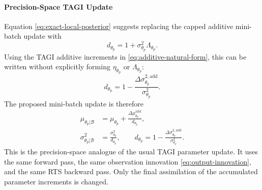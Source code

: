 \documentclass[11pt]{article}
\begin{document}
\paragraph{Precision-Space TAGI Update}
Equation \eqref{eq:exact-local-posterior} suggests replacing the capped
additive mini-batch update with
\begin{equation}
    d_{\theta_p}
    =
    1+\sigma^2_{\theta_p}\Lambda_{\theta_p}.
    \label{eq:precision-denom}
\end{equation}
Using the TAGI additive increments in \eqref{eq:additive-natural-form}, this
can be written without explicitly forming
\(
\eta_{\theta_p}
\)
or
\(
\Lambda_{\theta_p}
\):
\begin{equation}
    d_{\theta_p}
    =
    1
    -
    \frac{
    \Delta \sigma_{\theta_p}^{2,\mathrm{add}}
    }{
    \sigma^2_{\theta_p}
    }.
    \label{eq:denom-from-delta}
\end{equation}
The proposed mini-batch update is therefore
\begin{equation}
\boxed{
\begin{aligned}
    \mu_{\theta_p|\mathcal{B}}
    &=
    \mu_{\theta_p}
    +
    \frac{
    \Delta \mu_{\theta_p}^{\mathrm{add}}
    }{
    d_{\theta_p}
    },
    \\
    \sigma^2_{\theta_p|\mathcal{B}}
    &=
    \frac{
    \sigma^2_{\theta_p}
    }{
    d_{\theta_p}
    },
    \qquad
    d_{\theta_p}
    =
    1
    -
    \frac{
    \Delta \sigma_{\theta_p}^{2,\mathrm{add}}
    }{
    \sigma^2_{\theta_p}
    }.
\end{aligned}}
\label{eq:precision-tagi-update}
\end{equation}
This is the precision-space analogue of the usual TAGI parameter update. It
uses the same forward pass, the same observation innovation
\eqref{eq:output-innovation}, and the same RTS backward pass. Only the final
assimilation of the accumulated parameter increments is changed.
\end{document}
